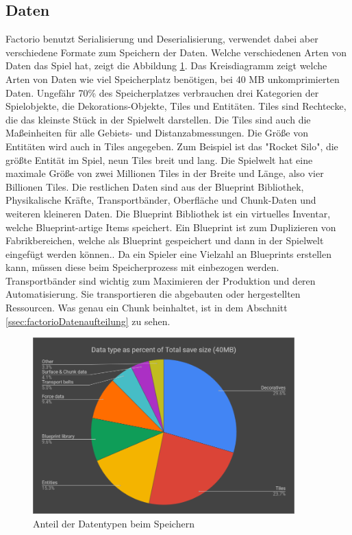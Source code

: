 \subsection{Daten}
Factorio benutzt Serialisierung und Deserialisierung, verwendet dabei aber verschiedene Formate zum Speichern der Daten. Welche verschiedenen Arten von Daten das Spiel hat, zeigt die Abbildung \ref{fig:factorioSaveStatistic}. Das Kreisdiagramm zeigt welche Arten von Daten wie viel Speicherplatz benötigen, bei 40 MB unkomprimierten Daten. Ungefähr 70\% des Speicherplatzes verbrauchen drei Kategorien der Spielobjekte, die Dekorations-Objekte, Tiles und Entitäten. Tiles sind Rechtecke, die das kleinste Stück in der Spielwelt darstellen. Die Tiles sind auch die Maßeinheiten für alle Gebiets- und Distanzabmessungen. Die Größe von Entitäten wird auch in Tiles angegeben. Zum Beispiel ist das "Rocket Silo", die größte Entität im Spiel, neun Tiles breit und lang. Die Spielwelt hat eine maximale Größe von zwei Millionen Tiles in der Breite und Länge, also vier Billionen Tiles.\cite{factorioMapStructure} Die restlichen Daten sind aus der Blueprint Bibliothek, Physikalische Kräfte, Transportbänder, Oberfläche und Chunk-Daten und weiteren kleineren Daten.\cite{factorioFridayFacts270} Die Blueprint Bibliothek ist ein virtuelles Inventar, welche Blueprint-artige Items speichert.\cite{factorioBlueprintLibrary} Ein Blueprint ist zum Duplizieren von Fabrikbereichen, welche als Blueprint gespeichert und dann in der Spielwelt eingefügt werden können.\cite{factorioBlueprint}. Da ein Spieler eine Vielzahl an Blueprints erstellen kann, müssen diese beim Speicherprozess mit einbezogen werden. Transportbänder sind wichtig zum Maximieren der Produktion und deren Automatisierung. Sie transportieren die abgebauten oder hergestellten Ressourcen. Was genau ein Chunk beinhaltet, ist in dem Abschnitt \ref{ssec:factorioDatenaufteilung} zu sehen. 

\begin{figure}[htp]
    \centering
    \includegraphics[width=0.9\textwidth]{images/factorio_save_statistic.png}
    \caption{Anteil der Datentypen beim Speichern\cite{factorioFridayFacts270}}
    \label{fig:factorioSaveStatistic}
\end{figure}



